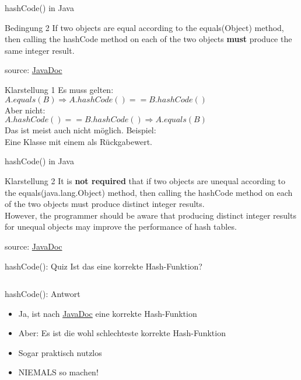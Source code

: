 \documentclass[usepdftitle=false,hyperref={pdfpagelabels=false}]{beamer}
\begin{document}
\begin{frame}{hashCode() in Java}
    \begin{block}{Bedingung 2}
        If two objects are equal according to the equals(Object)
        method, then calling the hashCode method on each of the two
        objects \textbf{must} produce the same integer result.
    \end{block}
    {\tiny source: \href{http://docs.oracle.com/javase/7/docs/api/java/lang/Object.html\#hashCode()}{JavaDoc}}

    \pause

    \begin{block}{Klarstellung 1}
        Es muss gelten:\\
        $A.equals(B) \Rightarrow A.hashCode() == B.hashCode()$\\
        Aber nicht:\\
        $A.hashCode() == B.hashCode() \Rightarrow A.equals(B)$\\
        Das ist meist auch nicht möglich. Beispiel:\\
        Eine Klasse mit einem  als Rückgabewert.
    \end{block}
\end{frame}

\begin{frame}{hashCode() in Java}
    \begin{block}{Klarstellung 2}
        It is \textbf{not required} that if two objects are unequal according
        to the equals(java.lang.Object) method, then calling the
        hashCode method on each of the two objects must produce
        distinct integer results.\\
        However, the programmer should be
        aware that producing distinct integer results for unequal
        objects may improve the performance of hash tables.
    \end{block}
    {\tiny source: \href{http://docs.oracle.com/javase/7/docs/api/java/lang/Object.html\#hashCode()}{JavaDoc}}
\end{frame}

\begin{frame}{hashCode(): Quiz}
    Ist das eine korrekte Hash-Funktion?
    \inputminted[linenos=true, numbersep=5pt, tabsize=4, fontsize=\tiny]{java}{Country-hashCode.java}
\end{frame}

\begin{frame}{hashCode(): Antwort}
    \begin{itemize}[<+->]
        \item Ja, ist nach \href{http://docs.oracle.com/javase/7/docs/api/java/lang/Object.html\#hashCode()}{JavaDoc} eine korrekte
              Hash-Funktion
        \item Aber: Es ist die wohl schlechteste korrekte Hash-Funktion
        \item Sogar praktisch nutzlos
        \item \alert<5>{NIEMALS} so machen!
    \end{itemize}
\end{frame}
\end{document}
